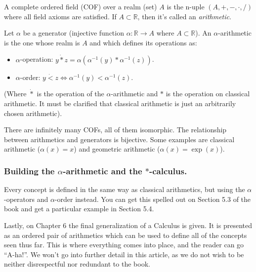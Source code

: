 A complete ordered field (COF) over a realm (set) $A$ is the n-uple $(A, +, -, \cdot, /)$ where all field axioms are satisfied. If $A \subset \mathbb{R}$, then it's called an \textit{arithmetic}.

Let $\alpha$ be a generator (injective function $\alpha: \mathbb{R} \to A$ where $A \subset \mathbb{R}$). An $\alpha$-arithmetic is the one whose realm is $A$ and which defines its operations as:

\begin{itemize}
	\item $\alpha$-operation: $y \dot{*} z = \alpha(\alpha^{-1}(y) * \alpha^{-1}(z))$.
	\item $\alpha$-order: $y \dot{<} z \iff \alpha^{-1}(y) < \alpha^{-1}(z)$.
\end{itemize}

(Where $\dot{*}$ is the operation of the $\alpha$-arithmetic and $*$ is the operation on classical arithmetic. It must be clarified that classical arithmetic is just an arbitrarily chosen arithmetic).

There are infinitely many COFs, all of them isomorphic. The relationship between arithmetics and generators is bijective. Some examples are classical arithmetic ($\alpha(x) = x$) and geometric arithmetic ($\alpha(x) = \exp(x)$).

\subsubsection{Building the $\alpha$-arithmetic and the $*$-calculus.}

Every concept is defined in the same way as classical arithmetics, but using the $\alpha$-operators and $\alpha$-order instead. You can get this spelled out on Section 5.3 of the book and get a particular example in Section 5.4.

Lastly, on Chapter 6 the final generalization of a Calculus is given. It is presented as an ordered pair of arithmetics which can be used to define all of the concepts seen thus far. This is where everything comes into place, and the reader can go \enquote{A-ha!}. We won't go into further detail in this article, as we do not wish to be neither disrespectful nor redundant to the book.
